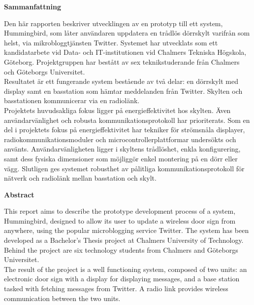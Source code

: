 \documentclass[a4paper,11pt]{article}
\begin{document}
\thispagestyle{empty}
\begin{center}
{\noindent \bf Sammanfattning}\\
\end{center}

Den här rapporten beskriver utvecklingen av en prototyp till ett system, Hummingbird, som låter användaren uppdatera en trådlös dörrskylt varifrån som helst, via mikrobloggtjänsten Twitter. Systemet har utvecklats som ett kandidatarbete vid Data- och IT-institutionen vid Chalmers Tekniska Högskola, Göteborg. Projektgruppen har bestått av sex teknikstuderande från Chalmers och Göteborgs Universitet.\\

Resultatet är ett fungerande system bestående av två delar: en dörrskylt med display samt en basstation som hämtar meddelanden från Twitter. Skylten och basstationen kommunicerar via en radiolänk.\\

Projektets huvudsakliga fokus ligger på energieffektivitet hos skylten. Även användarvänlighet och robusta kommunikationsprotokoll har prioriterats. Som en del i projektets fokus på energieffektivitet har tekniker för strömsnåla displayer, radiokommunikationsmoduler och microcontrollerplattformar undersökts och använts. Användarvänligheten ligger i skyltens trådlöshet, enkla konfigurering, samt dess fysiska dimensioner som möjliggör enkel montering på en dörr eller vägg. Slutligen ges systemet robusthet av pålitliga kommunikationsprotokoll för nätverk och radiolänk mellan basstation och skylt.

\thispagestyle{empty}
\pagebreak

\thispagestyle{empty}
\begin{center}
{\noindent \bf Abstract}\\
\end{center}

This report aims to describe the prototype development process of a system, Hummingbird, designed to allow its user to update a wireless door sign from anywhere, using the popular microblogging service Twitter. The system has been developed as a Bachelor’s Thesis project at Chalmers University of Technology. Behind the project are six technology students from Chalmers and Göteborgs Universitet.\\

The result of the project is a well functioning system, composed of two units: an electronic door sign with a display for displaying messages, and a base station tasked with fetching messages from Twitter. A radio link provides wireless communication between the two units.\\
\end{document}
